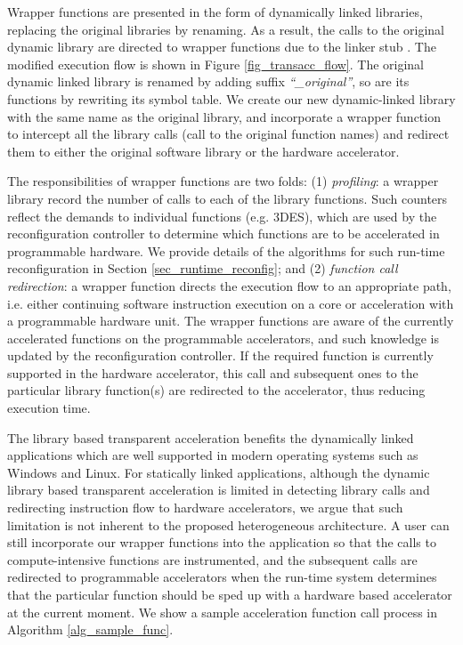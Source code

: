 Wrapper functions are presented in the form of dynamically linked
libraries, replacing the original libraries by renaming. As a result,
the calls to the original dynamic library are directed to wrapper
functions due to the linker stub \cite{linkerstub}. The modified
execution flow is shown in Figure \ref{fig_transacc_flow}.  The
original dynamic linked library is renamed by adding suffix
{\em ``\_original''}, so are its functions by rewriting its symbol table. We
create our new dynamic-linked library with the same name as the original library, and
incorporate a wrapper function to intercept all the library calls
(call to the original function names) and
redirect them to either the original software library or the hardware accelerator.

The responsibilities of wrapper functions are two folds: (1) {\em profiling}:
a wrapper library record the number of calls to each of the
library functions. Such counters reflect the demands to individual
functions (e.g. 3DES), which are used by the reconfiguration
controller to determine which functions are to be accelerated in
programmable hardware. We provide details of the algorithms for such
run-time reconfiguration in Section \ref{sec_runtime_reconfig}; and (2)
{\em function call redirection}: a wrapper function directs the
execution flow to an appropriate path, i.e. either continuing software instruction execution on a core or
acceleration with a programmable hardware unit. The wrapper functions
are aware of the currently accelerated functions on the programmable
accelerators, and such knowledge is updated by the reconfiguration
controller. If the required function is currently supported in the hardware
accelerator, this call and subsequent ones to the particular library
function(s) are redirected to the accelerator, thus reducing execution
time.

The library based transparent acceleration benefits the dynamically
linked applications which are well supported in modern operating
systems such as Windows and Linux. For statically linked applications,
although the dynamic library based transparent acceleration is limited
in detecting library calls and redirecting instruction flow to
hardware accelerators, we argue that such limitation is not inherent
to the proposed heterogeneous architecture. A user can still
incorporate our wrapper functions into the application so that the
calls to compute-intensive functions are instrumented, and the
subsequent calls are redirected to programmable accelerators when the
run-time system determines that the particular function should be sped
up with a hardware based accelerator at the current moment.
We show a sample acceleration function call process in Algorithm \ref{alg_sample_func}.

